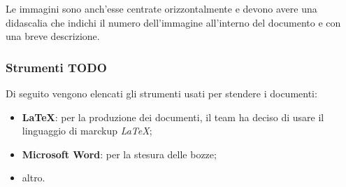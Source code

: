 Le immagini sono anch'esse centrate orizzontalmente e devono avere una didascalia che indichi il numero dell'immagine all'interno del documento e con una breve descrizione.

\subsubsection{Strumenti TODO}
Di seguito vengono elencati gli strumenti usati per stendere i documenti:
\begin {itemize}
\item \textbf{\LaTeX}: per la produzione dei documenti, il team ha deciso di usare il linguaggio di marckup \textit{\LaTeX};
\item \textbf{Microsoft Word}: per la stesura delle bozze;
\item altro.
\end {itemize}